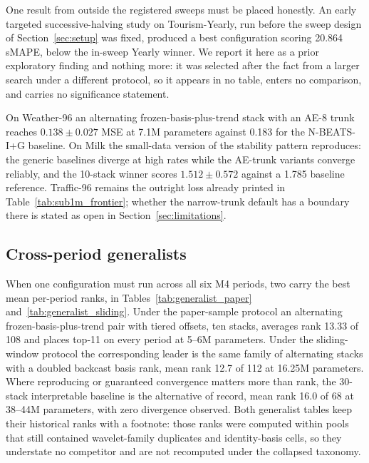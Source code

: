 One result from outside the registered sweeps must be placed honestly.
An early targeted successive-halving study on Tourism-Yearly, run before
the sweep design of Section~\ref{sec:setup} was fixed, produced a best
configuration scoring 20.864 sMAPE, below the in-sweep Yearly winner.
We report it here as a prior exploratory finding and nothing more: it
was selected after the fact from a larger search under a different
protocol, so it appears in no table, enters no comparison, and carries
no significance statement.

On Weather-96 an alternating frozen-basis-plus-trend stack with an AE-8
trunk reaches $0.138 \pm 0.027$ MSE at 7.1M parameters against 0.183
for the N-BEATS-I+G baseline. On Milk the small-data version of the
stability pattern reproduces: the generic baselines diverge at high
rates while the AE-trunk variants converge reliably, and the 10-stack
winner scores $1.512 \pm 0.572$ against a 1.785 baseline reference.
Traffic-96 remains the outright loss already printed in
Table~\ref{tab:sub1m_frontier}; whether the narrow-trunk default has a
boundary there is stated as open in Section~\ref{sec:limitations}.

\subsection{Cross-period generalists}
\label{sec:results:generalists}

When one configuration must run across all six M4 periods, two carry the
best mean per-period ranks, in Tables~\ref{tab:generalist_paper}
and~\ref{tab:generalist_sliding}. Under the paper-sample protocol an
alternating frozen-basis-plus-trend pair with tiered offsets, ten
stacks, averages rank 13.33 of 108 and places top-11 on every period at
5--6M parameters. Under the sliding-window protocol the corresponding
leader is the same family of alternating stacks with a doubled backcast
basis rank, mean rank 12.7 of 112 at 16.25M parameters. Where
reproducing \citet{oreshkin2020nbeats} or guaranteed convergence matters
more than rank, the 30-stack interpretable baseline is the alternative
of record, mean rank 16.0 of 68 at 38--44M parameters, with zero
divergence observed. Both generalist tables keep their historical ranks
with a footnote: those ranks were computed within pools that still
contained wavelet-family duplicates and identity-basis cells, so they
understate no competitor and are not recomputed under the collapsed
taxonomy.



